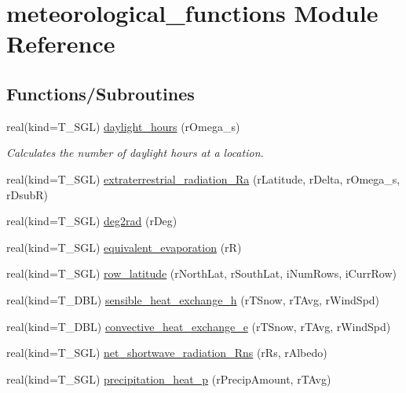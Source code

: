\hypertarget{namespacemeteorological__functions}{
\section{meteorological\_\-functions Module Reference}
\label{namespacemeteorological__functions}
}
\subsection*{Functions/Subroutines}
\begin{DoxyCompactItemize}
\item 
real(kind=T\_\-SGL) \hyperlink{namespacemeteorological__functions_a0228a2c9f92d212730d57a308c27d6a7}{daylight\_\-hours} (rOmega\_\-s)
\begin{DoxyCompactList}\small\item\em Calculates the number of daylight hours at a location. \item\end{DoxyCompactList}\item 
real(kind=T\_\-SGL) \hyperlink{namespacemeteorological__functions_a934777cd90ce18fe8fce7d7cfed5bf35}{extraterrestrial\_\-radiation\_\-Ra} (rLatitude, rDelta, rOmega\_\-s, rDsubR)
\item 
real(kind=T\_\-SGL) \hyperlink{namespacemeteorological__functions_ad6b54db0b5a7ad72d029c8d4d252e0c3}{deg2rad} (rDeg)
\item 
real(kind=T\_\-SGL) \hyperlink{namespacemeteorological__functions_ae644c82b94c9b7d74340c161115f5b7c}{equivalent\_\-evaporation} (rR)
\item 
real(kind=T\_\-SGL) \hyperlink{namespacemeteorological__functions_a50fc95bc69ce9e9fd28b0e1696697a7d}{row\_\-latitude} (rNorthLat, rSouthLat, iNumRows, iCurrRow)
\item 
real(kind=T\_\-DBL) \hyperlink{namespacemeteorological__functions_af2672c6758aee047fb536dd125dce2f3}{sensible\_\-heat\_\-exchange\_\-h} (rTSnow, rTAvg, rWindSpd)
\item 
real(kind=T\_\-DBL) \hyperlink{namespacemeteorological__functions_a90b4e8a09fb5c0597f52bd44adfb2e24}{convective\_\-heat\_\-exchange\_\-e} (rTSnow, rTAvg, rWindSpd)
\item 
real(kind=T\_\-SGL) \hyperlink{namespacemeteorological__functions_a35ff0a37cae7cf1ff85ecf7daa47303e}{net\_\-shortwave\_\-radiation\_\-Rns} (rRs, rAlbedo)
\item 
real(kind=T\_\-SGL) \hyperlink{namespacemeteorological__functions_abd07fab175427fff1c33d3dc204c385d}{precipitation\_\-heat\_\-p} (rPrecipAmount, rTAvg)

\end{DoxyCompactItemize}
